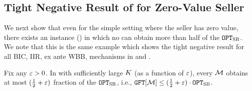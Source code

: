 \subsection{Tight Negative Result of {\NashSocialWelfareMaximizer} for Zero-Value Seller}
We next show that even for the simple setting where the seller has zero value,
there exists an instance () in which no {\NashSocialWelfareMaximizer} can obtain more than half of the {\SecondBest} $\texttt{OPT}_{\textsc{SB}}$. We note that this is the same example which shows the tight negative result for all BIC, IIR, ex ante WBB, {\ksfair} mechanisms in  and .

\begin{lemma}
\label{lem:NSWM GFT UB:general instance}
    Fix any $\varepsilon > 0$.
    In  with sufficiently large $K$ (as a function of $\varepsilon$), every {\NashSocialWelfareMaximizer} $\mathcal{M}$ obtains at most $(\frac{1}{2} + \varepsilon)$ fraction of the {\SecondBest} $\texttt{OPT}_{\textsc{SB}}$, i.e., $\GFT{\mech} \leq (\frac{1}{2} + \eps) \cdot \OPTSB$. 
\end{lemma}

